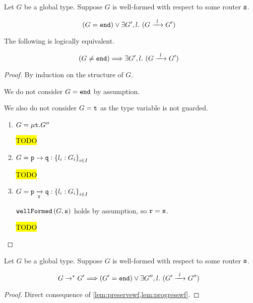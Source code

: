 \begin{lemma}
Let $G$ be a global type.
Suppose $G$ is well-formed with respect to some router $\mrole{s}$.

\[
(G = \tend) \vee \exists G', l. ~ (\treduce{G}{G'}{l})
\]

The following is logically equivalent.

\[
(G \neq \tend)
	\Longrightarrow 
\exists G', l. ~ (\treduce{G}{G'}{l})
\]

\label{lem:progresswf}
\end{lemma}

\begin{proof}
By induction on the structure of $G$.

We do not consider $G = \tend$ by assumption.

We also do not consider $G = \trecvar$ as the type variable is not guarded.

\begin{enumerate}

\item $G = \trec{G''}$

\hl{TODO}

\item $G = \gcomm{p}{q}{l_i: G_i}{i \in I}$

\hl{TODO}

\item $G = \groute{p}{q}{r}{l_i: G_i}{i \in I}$

$\wfnew{G}{s}$ holds by assumption, so $\mrole{r} = \mrole{s}$.

\hl{TODO}

\end{enumerate}

\end{proof}

\begin{theorem}
Let $G$ be a global type.
Suppose $G$ is well-formed with respect to some router $\mrole{s}$.

\[
G \to^* G'
	\Longrightarrow
(G' = \tend) \vee \exists G'', l. ~ 
	(\treduce{G'}{G''}{l})
\]

\end{theorem}

\begin{proof}
Direct consequence of 
\cref{lem:preservewf,lem:progresswf}.
\end{proof}